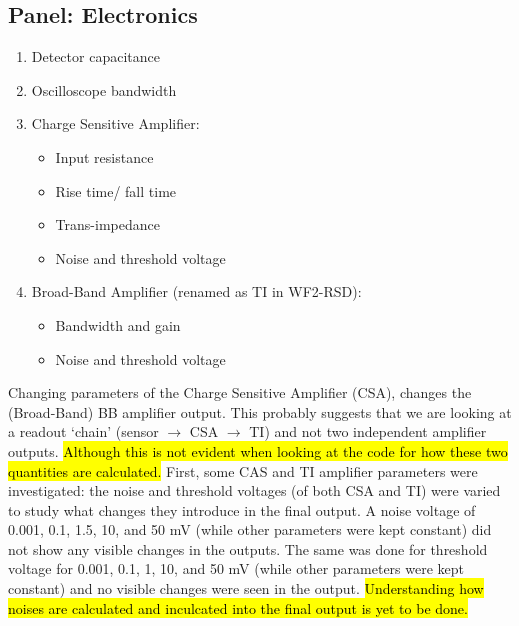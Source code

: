 \documentclass[11pt]{article}
\newcommand{\hlyellow}[1]{{\sethlcolor{yellow}\hl{#1}}}
\begin{document}
\subsection{Panel: Electronics}
\begin{enumerate}
    \item Detector capacitance
    \item Oscilloscope bandwidth
    \item Charge Sensitive Amplifier:
    \begin{itemize}
        \item Input resistance
        \item Rise time/ fall time
        \item Trans-impedance
        \item Noise and threshold voltage
    \end{itemize}
    \item Broad-Band Amplifier (renamed as TI in WF2-RSD):
    \begin{itemize}
        \item Bandwidth and gain
        \item Noise and threshold voltage
    \end{itemize}
\end{enumerate}
Changing parameters of the Charge Sensitive Amplifier (CSA), changes the (Broad-Band) BB amplifier output. This probably suggests that we are looking at a readout `chain' (sensor $\rightarrow$ CSA $\rightarrow$ TI) and not two independent amplifier outputs. \hlyellow{Although this is not evident when looking at the code for how these two quantities are calculated.}
\newline
First, some CAS and TI amplifier parameters were investigated: the noise and threshold voltages (of both CSA and TI) were varied to study what changes they introduce in the final output. A noise voltage of 0.001, 0.1, 1.5, 10, and 50 mV (while other parameters were kept constant) did not show any visible changes in the outputs. The same was done for threshold voltage for 0.001, 0.1, 1, 10, and 50 mV (while other parameters were kept constant) and no visible changes were seen in the output. \hlyellow{Understanding how noises are calculated and inculcated into the final output is yet to be done.}
\end{document}
